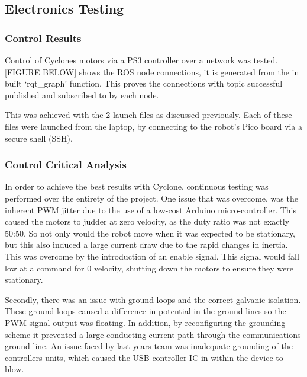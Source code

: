 \subsection{Electronics Testing}
\subsubsection{Control Results}
Control of Cyclones motors via a PS3 controller over a network was tested. [FIGURE BELOW] shows the ROS node connections, it is generated from the in built ‘rqt\_graph' function. This proves the connections with topic successful published and subscribed to by each node.\par


This was achieved with the 2 launch files as discussed previously. Each of these files were launched from the laptop, by connecting to the robot’s Pico board via a secure shell (SSH).\par


\subsubsection{Control Critical Analysis}
In order to achieve the best results with Cyclone, continuous testing was performed over the entirety of the project. One issue that was overcome, was the inherent PWM jitter due to the use of a low-cost Arduino micro-controller. This caused the motors to judder at zero velocity, as the duty ratio was not exactly 50:50. So not only would the robot move when it was expected to be stationary, but this also induced a large current draw due to the rapid changes in inertia. This was overcome by the introduction of an enable signal. This signal would fall low at a command for 0 velocity, shutting down the motors to ensure they were stationary.\par

Secondly, there was an issue with ground loops and the correct galvanic isolation. These ground loops caused a difference in potential in the ground lines so the PWM signal output was floating. In addition, by reconfiguring the grounding scheme it prevented a large conducting current path through the communications ground line. An issue faced by last years team was inadequate grounding of the controllers units, which caused the USB controller IC in within the device to blow.\par

